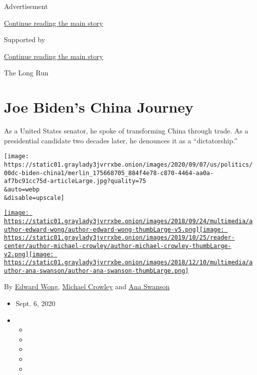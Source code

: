 Advertisement

\protect\hyperlink{after-top}{Continue reading the main story}

Supported by

\protect\hyperlink{after-sponsor}{Continue reading the main story}

The Long Run

\hypertarget{joe-bidens-china-journey}{%
\section{Joe Biden's China Journey}\label{joe-bidens-china-journey}}

As a United States senator, he spoke of transforming China through
trade. As a presidential candidate two decades later, he denounces it as
a ``dictatorship.''

\texttt{[image: https://static01.graylady3jvrrxbe.onion/images/2020/09/07/us/politics/00dc-biden-china1/merlin\_175668705\_884f4e78-c870-4464-aa0a-af7bc91cc75d-articleLarge.jpg?quality=75\\\&auto=webp\\\&disable=upscale]}

\href{https://www.nytimes3xbfgragh.onion/by/edward-wong}{\texttt{[image: https://static01.graylady3jvrrxbe.onion/images/2018/09/24/multimedia/author-edward-wong/author-edward-wong-thumbLarge-v5.png]}}\href{https://www.nytimes3xbfgragh.onion/by/michael-crowley}{\texttt{[image: https://static01.graylady3jvrrxbe.onion/images/2019/10/25/reader-center/author-michael-crowley/author-michael-crowley-thumbLarge-v2.png]}}\href{https://www.nytimes3xbfgragh.onion/by/ana-swanson}{\texttt{[image: https://static01.graylady3jvrrxbe.onion/images/2018/12/10/multimedia/author-ana-swanson/author-ana-swanson-thumbLarge.png]}}

By \href{https://www.nytimes3xbfgragh.onion/by/edward-wong}{Edward
Wong},
\href{https://www.nytimes3xbfgragh.onion/by/michael-crowley}{Michael
Crowley} and
\href{https://www.nytimes3xbfgragh.onion/by/ana-swanson}{Ana Swanson}

\begin{itemize}
\item
  Sept. 6, 2020
\item
  \begin{itemize}
  \item
  \item
  \item
  \item
  \item
  \end{itemize}
\end{itemize}

